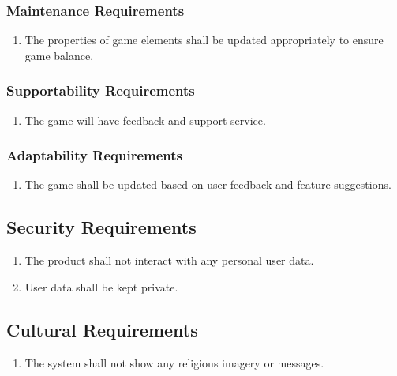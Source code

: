 \documentclass[12pt, titlepage]{article}
\begin{document}
\subsubsection{Maintenance Requirements}
\label{ssub:maintenance_requirements}
\begin{enumerate}[{MS}1. ]
	\item The properties of game elements shall be updated appropriately to ensure game balance.
\end{enumerate}

\subsubsection{Supportability Requirements}
\label{ssub:supportability_requirements}
\begin{enumerate}[{MS}1. ]
	\item The game will have feedback and support service.
\end{enumerate}

\subsubsection{Adaptability Requirements}
\label{ssub:adaptability_requirements}
\begin{enumerate}[{MS}1. ]
	\item The game shall be updated based on user feedback and feature suggestions.
\end{enumerate}




\subsection{Security Requirements}
\begin{enumerate}[{SR}1. ]
	\item  The product shall not interact with any personal user data.
	\item  User data shall be kept private.
\end{enumerate}

\subsection{Cultural Requirements}
\begin{enumerate}[{CR}1. ]
	\item The system shall not show any religious imagery or messages.
\end{enumerate}
\end{document}
